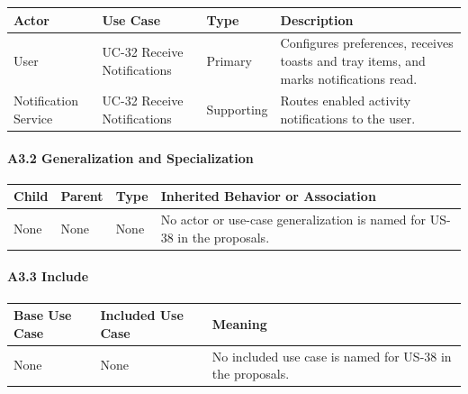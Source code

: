 \documentclass[12pt]{article}
\renewcommand{\baselinestretch}{1.5}
\begin{document}
\begingroup
\small
\renewcommand{\baselinestretch}{1.0}\selectfont
\renewcommand{\arraystretch}{1.15}
\setlength{\tabcolsep}{6pt}
\begin{longtable}{|>{\raggedright\arraybackslash}p{}|>{\raggedright\arraybackslash}p{}|>{\raggedright\arraybackslash}p{}|>{\raggedright\arraybackslash}p{}|}
\hline
\textbf{Actor} & \textbf{Use Case} & \textbf{Type} & \textbf{Description} \\ \hline
\endhead
User & UC-32 Receive Notifications & Primary & Configures preferences, receives toasts and tray items, and marks notifications read. \\ \hline
Notification Service & UC-32 Receive Notifications & Supporting & Routes enabled activity notifications to the user. \\ \hline
\end{longtable}
\endgroup
\par\medskip

\hypertarget{sec:a3-2-generalization-and-specialization}{}
\paragraph*{A3.2 Generalization and Specialization}
\par\medskip

\begingroup
\small
\renewcommand{\baselinestretch}{1.0}\selectfont
\renewcommand{\arraystretch}{1.15}
\setlength{\tabcolsep}{6pt}
\begin{longtable}{|>{\raggedright\arraybackslash}p{}|>{\raggedright\arraybackslash}p{}|>{\raggedright\arraybackslash}p{}|>{\raggedright\arraybackslash}p{}|}
\hline
\textbf{Child} & \textbf{Parent} & \textbf{Type} & \textbf{Inherited Behavior or Association} \\ \hline
\endhead
None & None & None & No actor or use-case generalization is named for US-38 in the proposals. \\ \hline
\end{longtable}
\endgroup
\par\medskip

\hypertarget{sec:a3-3-include}{}
\paragraph*{A3.3 Include}
\par\medskip

\begingroup
\small
\renewcommand{\baselinestretch}{1.0}\selectfont
\renewcommand{\arraystretch}{1.15}
\setlength{\tabcolsep}{6pt}
\begin{longtable}{|>{\raggedright\arraybackslash}p{}|>{\raggedright\arraybackslash}p{}|>{\raggedright\arraybackslash}p{}|}
\hline
\textbf{Base Use Case} & \textbf{Included Use Case} & \textbf{Meaning} \\ \hline
\endhead
None & None & No included use case is named for US-38 in the proposals. \\ \hline
\end{longtable}
\endgroup
\par\medskip
\end{document}
